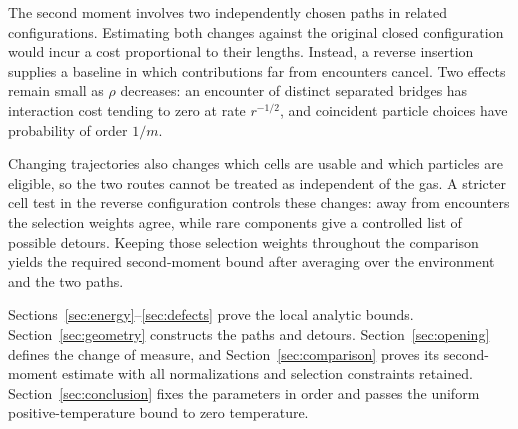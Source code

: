 The second moment involves two independently chosen paths in related
configurations. Estimating both changes against the original closed
configuration would incur a cost proportional to their lengths.
Instead, a reverse insertion supplies a baseline in which contributions
far from encounters cancel. Two effects remain small as $\rho$ decreases:
an encounter of distinct separated bridges has interaction cost tending
to zero at rate $r^{-1/2}$, and coincident particle choices have probability
of order $1/m$.

Changing trajectories also changes which cells are usable and which
particles are eligible, so the two routes cannot be treated as independent
of the gas. A stricter cell test in the reverse configuration controls
these changes: away from encounters the selection weights agree, while
rare components give a controlled list of possible detours. Keeping
those selection weights throughout the comparison yields the required
second-moment bound after averaging over the environment and the two
paths.

Sections~\ref{sec:energy}--\ref{sec:defects} prove the local analytic
bounds. Section~\ref{sec:geometry} constructs the paths and detours.
Section~\ref{sec:opening} defines the change of measure, and
Section~\ref{sec:comparison} proves its second-moment estimate with all
normalizations and selection constraints retained.
Section~\ref{sec:conclusion} fixes the parameters in order and passes
the uniform positive-temperature bound to zero temperature.
